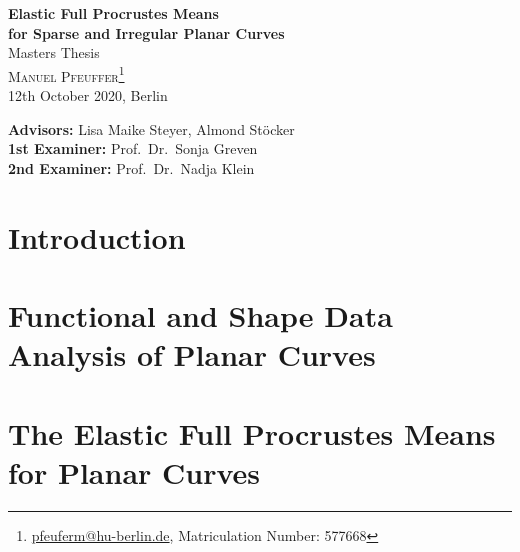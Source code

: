 \documentclass[a4paper,12pt,pagesize,DIV=calc,smallheadings,english]{article}
\begin{document}

\begin{titlepage}

  \vspace*{0.5cm}

  \begin{center}
    {\LARGE\textbf{Elastic Full Procrustes Means\vspace{0.4cm}\\
    for Sparse and Irregular Planar Curves}}
  \vspace{1cm}\\
    {\large Masters Thesis}
  \vspace{0.7cm}\\
  \textsc{Manuel Pfeuffer\footnote{\url{pfeuferm@hu-berlin.de}, Matriculation Number: 577668}}
  \vspace{0.1cm}\\
  12th October 2020, Berlin
  \vspace{1cm}\\

  \vfill
  \end{center}

  \noindent \textbf{Advisors:} Lisa Maike Steyer, Almond Stöcker\\
  \noindent \textbf{1st Examiner:} Prof.\ Dr.\ Sonja Greven\\
  \noindent \textbf{2nd Examiner:} Prof.\ Dr.\ Nadja Klein
  \vspace{0.5em}

\end{titlepage}

\tableofcontents



\newpage
{}
\section{Introduction}
\label{sec:intro}


\newpage
\section{Functional and Shape Data Analysis of Planar Curves}
\label{sec:theo}


\newpage
\section{The Elastic Full Procrustes Means for Planar Curves}
\label{sec:mean}

\end{document}
